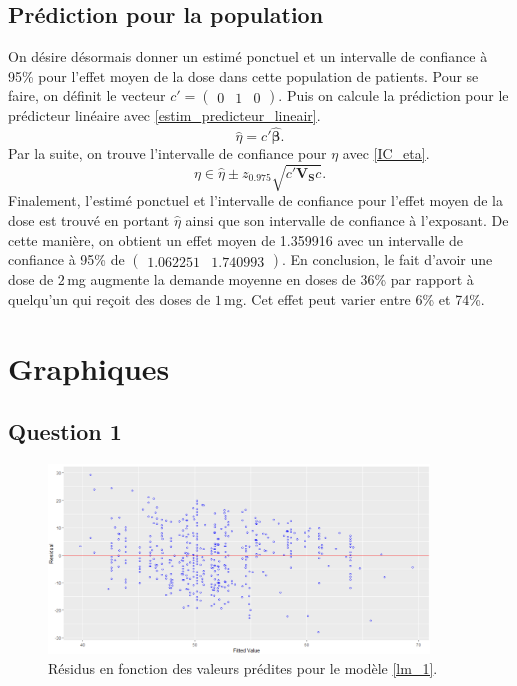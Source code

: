 \documentclass{article}
\begin{document}
	\subsection{Prédiction pour la population}
	On désire désormais donner un estimé ponctuel et un intervalle de confiance à 95\% pour l’effet moyen de la dose dans cette population de patients.	
	Pour se faire, on définit le vecteur $c' = \begin{pmatrix} 0 & 1 & 0\end{pmatrix}$. Puis on calcule la prédiction pour le prédicteur linéaire avec	\eqref{estim_predicteur_lineair}.
	\begin{equation}\label{estim_predicteur_lineair}
		\hat{\eta} = c'\hat{\boldsymbol{\beta}}.
	\end{equation}
	Par la suite, on trouve l'intervalle de confiance pour $\eta$ avec \eqref{IC_eta}.
	\begin{equation}\label{IC_eta}
		\eta \in \hat{\eta} \pm z_{0.975} \sqrt{c' \boldsymbol{V_S} c }.
	\end{equation}
	Finalement, l'estimé ponctuel et l'intervalle de confiance pour l'effet moyen de la dose est trouvé en portant $\hat{\eta}$ ainsi que son intervalle de confiance à l'exposant. De cette manière, on obtient
	un effet moyen de 1.359916 avec un intervalle de confiance à 95\% de 
	$\begin{pmatrix}1.062251 & 1.740993\end{pmatrix}$. En conclusion, le fait d'avoir une dose de $2\,$mg augmente la demande moyenne en doses de 36\% par rapport à quelqu'un qui reçoit des doses de $1\,$mg. Cet effet peut varier entre 6\% et 74\%.

	
	
\newpage
\appendix
\section{Graphiques}
\renewcommand\thesubsection{\thesection.\arabic{subsection}}
\subsection{Question 1}

\begin{figure}[H]  %
	\centering
	\includegraphics[width=0.9\textwidth]{graphiques/residus_VS_predicitions_lm1}
	\caption{Résidus en fonction des valeurs prédites pour le modèle \eqref{lm_1}.}
	\label{residus_VS_predicitions_lm1}
\end{figure}
\end{document}
